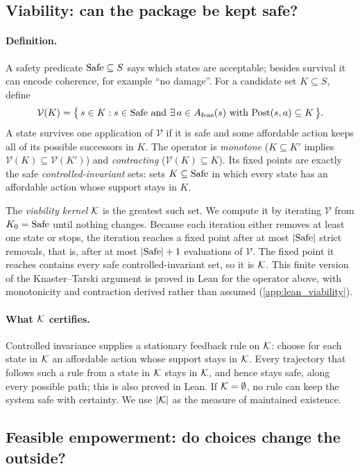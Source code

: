 \subsection{Viability: can the package be kept safe?}
\paragraph{Definition.}
A safety predicate $\mathrm{Safe}\subseteq S$ says which states are acceptable; besides survival it can encode coherence, for example ``no damage''. For a candidate set $K\subseteq S$, define
\[
\mathcal{V}(K) = \bigl\{\, s\in K : s\in\Safe \ \text{and}\ \exists\, a\in \Afeas(s)\ \text{with}\ \Post(s,a)\subseteq K \,\bigr\}.
\]
A state survives one application of $\mathcal{V}$ if it is safe and some affordable action keeps all of its possible successors in $K$. The operator is \emph{monotone} ($K\subseteq K'$ implies $\mathcal{V}(K)\subseteq\mathcal{V}(K')$) and \emph{contracting} ($\mathcal{V}(K)\subseteq K$). Its fixed points are exactly the safe \emph{controlled-invariant} sets: sets $K\subseteq\mathrm{Safe}$ in which every state has an affordable action whose support stays in $K$.

The \emph{viability kernel} $\mathcal{K}$ \citep{aubin1991} is the greatest such set. We compute it by iterating $\mathcal{V}$ from $K_0=\mathrm{Safe}$ until nothing changes. Because each iteration either removes at least one state or stops, the iteration reaches a fixed point after at most $|\mathrm{Safe}|$ strict removals, that is, after at most $|\mathrm{Safe}|+1$ evaluations of $\mathcal{V}$. The fixed point it reaches contains every safe controlled-invariant set, so it is $\mathcal{K}$. This finite version of the Knaster--Tarski argument \citep{tarski1955} is proved in Lean for the operator above, with monotonicity and contraction derived rather than assumed (\cref{app:lean_viability}).

\paragraph{What $\mathcal{K}$ certifies.}
Controlled invariance supplies a stationary feedback rule on $\mathcal{K}$: choose for each state in $\mathcal{K}$ an affordable action whose support stays in $\mathcal{K}$. Every trajectory that follows such a rule from a state in $\mathcal{K}$ stays in $\mathcal{K}$, and hence stays safe, along every possible path; this is also proved in Lean. If $\mathcal{K}=\emptyset$, no rule can keep the system safe with certainty. We use $|\mathcal{K}|$ as the measure of maintained existence.

\subsection{Feasible empowerment: do choices change the outside?}
